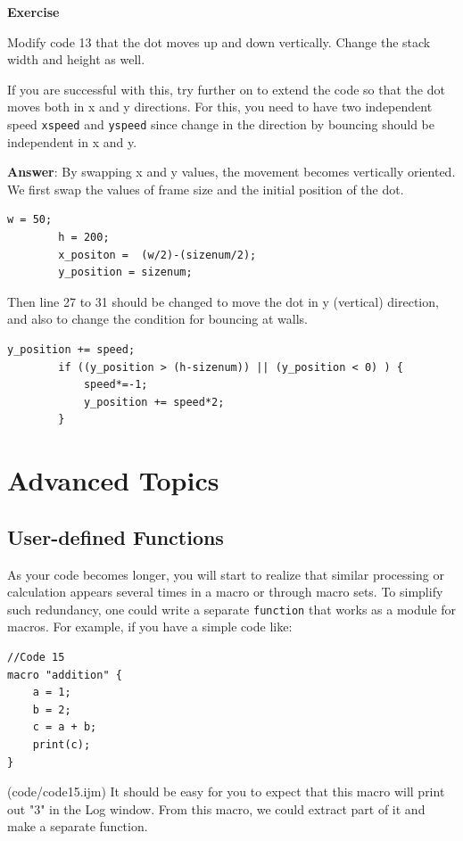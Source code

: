 \documentclass[11pt,a4paper,oneside]{report}
\newenvironment{indentexercise}[1]
{{\setlength{\leftmargin}{2em}}
\textbf{Exercise \thesubsection-#1}
\begin{list}{}
	\item
}
{\end{list}}
\newcommand{\ilcom}[1]{\texttt{\small#1}}
\begin{document}
\begin{indentexercise}{2}
Modify code 13 that the dot moves up and down vertically. Change the stack width and height as well. 

If you are successful with this, try further on to extend the code so that the dot moves both in x and y directions. For this, you need to have two independent speed \ilcom{xspeed} and \ilcom{yspeed} since change in the direction by bouncing should be independent in x and y. 

\item \textbf{Answer}: By swapping x and y values, the movement becomes vertically oriented. We first swap the values of frame size and the initial position of the dot.  
	\begin{lstlisting}[numbers=none]
		w = 50;
		h = 200;
		x_positon =  (w/2)-(sizenum/2);
		y_position = sizenum;
	\end{lstlisting}
	Then line 27 to 31 should be changed to move the dot in y (vertical) direction, and also to change the condition for bouncing at walls.
	\begin{lstlisting}[numbers=none]
		y_position += speed;
		if ((y_position > (h-sizenum)) || (y_position < 0) ) { 
			speed*=-1;
			y_position += speed*2;
		}
	\end{lstlisting}

\end{indentexercise}

 
\newpage

\section{Advanced Topics}
\label{sec:advancedTopics}

  \subsection{User-defined Functions}

As your code becomes longer, 
you will start to realize that similar processing or 
calculation appears several times in a macro or through macro sets. 
To simplify such redundancy, one could write a 
separate \ilcom{function} that works as a module for macros. 
For example, if you have a simple code like:

\begin{lstlisting}[morekeywords={*,}]
//Code 15
macro "addition" {
	a = 1;
	b = 2;
	c = a + b;
	print(c);
}
\end{lstlisting}
(code/code15.ijm)
It should be easy for you to expect that this macro will print out "3" in the Log window. 
From this macro, we could extract part of it and make a separate function. 
\end{document}
